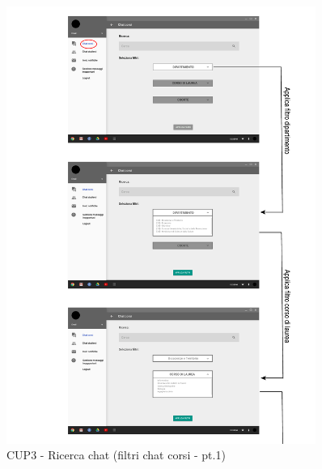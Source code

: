 \begin{figure}
	\centering
	\includegraphics[width=0.9\textwidth]{imgs/gruppo6/activities/act_cup3_filtro_chat_corsi1.pdf}
	\caption{CUP3 - Ricerca chat (filtri chat corsi - pt.1)}
	\label{fig:cup3}
\end{figure}

